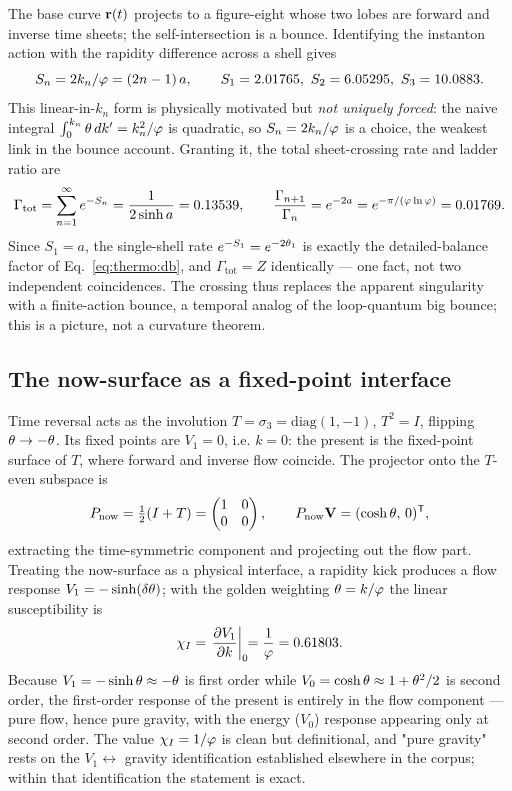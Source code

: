 The base curve $\mathbf{r}(t)$ projects to a figure-eight whose two lobes are forward and inverse time sheets; the self-intersection is a bounce. Identifying the instanton action with the rapidity difference across a shell gives
\begin{equation}
S_n=2k_n/\phigr=(2n-1)\,a,\qquad S_1=2.01765,\ S_2=6.05295,\ S_3=10.0883 .
\label{eq:thermo:Sn}
\end{equation}
This linear-in-$k_n$ form is physically motivated but \emph{not uniquely forced}: the naive integral $\int_0^{k_n}\theta\,dk'=k_n^2/\varphi$ is quadratic, so $S_n=2k_n/\varphi$ is a choice, the weakest link in the bounce account. Granting it, the total sheet-crossing rate and ladder ratio are
\begin{equation}
\Gamma_{\mathrm{tot}}=\sum_{n=1}^{\infty}e^{-S_n}=\frac{1}{2\sinh a}=0.13539,
\qquad \frac{\Gamma_{n+1}}{\Gamma_n}=e^{-2a}=e^{-\pi/(\varphi\ln\varphi)}=0.01769 .
\label{eq:thermo:gamma}
\end{equation}
Since $S_1=a$, the single-shell rate $e^{-S_1}=e^{-2\theta_1}$ is exactly the detailed-balance factor of Eq.~\eqref{eq:thermo:db}, and $\Gamma_{\mathrm{tot}}=Z$ identically --- one fact, not two independent coincidences. The crossing thus replaces the apparent singularity with a finite-action bounce, a temporal analog of the loop-quantum big bounce; this is a picture, not a curvature theorem.

\subsection{The now-surface as a fixed-point interface}

Time reversal acts as the involution $T=\sigma_3=\mathrm{diag}(1,-1)$, $T^2=I$, flipping $\theta\to-\theta$. Its fixed points are $V_1=0$, i.e. $k=0$: the present is the fixed-point surface of $T$, where forward and inverse flow coincide. The projector onto the $T$-even subspace is
\begin{equation}
P_{\mathrm{now}}=\tfrac12(I+T)=\begin{pmatrix}1&0\\0&0\end{pmatrix},
\qquad P_{\mathrm{now}}\mathbf{V}=(\cosh\theta,\,0)^{\mathsf T},
\label{eq:thermo:Pnow}
\end{equation}
extracting the time-symmetric component and projecting out the flow part. Treating the now-surface as a physical interface, a rapidity kick produces a flow response $V_1=-\sinh(\delta\theta)$; with the golden weighting $\theta=k/\varphi$ the linear susceptibility is
\begin{equation}
\chi_I=\left.\frac{\partial V_1}{\partial k}\right|_{0}\!\!=\frac{1}{\varphi}=0.61803 .
\label{eq:thermo:chi}
\end{equation}
Because $V_1=-\sinh\theta\approx-\theta$ is first order while $V_0=\cosh\theta\approx1+\theta^2/2$ is second order, the first-order response of the present is entirely in the flow component --- pure flow, hence pure gravity, with the energy ($V_0$) response appearing only at second order. The value $\chi_I=1/\varphi$ is clean but definitional, and "pure gravity" rests on the $V_1\leftrightarrow$ gravity identification established elsewhere in the corpus; within that identification the statement is exact.
